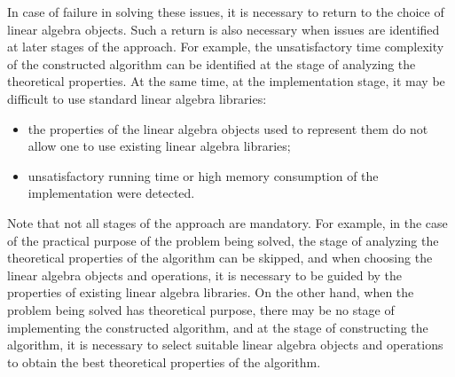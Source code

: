 In case of failure in solving these issues, it is necessary to return to the choice of linear algebra objects. Such a return is also necessary when issues are identified at later stages of the approach. For example, the unsatisfactory time complexity of the constructed algorithm can be identified at the stage of analyzing the theoretical properties. At the same time, at the implementation stage, it may be difficult to use standard linear algebra libraries:
\begin{itemize}
    \item the properties of the linear algebra objects used to represent them do not allow one to use existing linear algebra libraries;
    \item unsatisfactory running time or high memory consumption of the implementation were detected.
\end{itemize}

Note that not all stages of the approach are mandatory. For example, in the case of the practical purpose of the problem being solved, the stage of analyzing the theoretical properties of the algorithm can be skipped, and when choosing the linear algebra objects and operations, it is necessary to be guided by the properties of existing linear algebra libraries. On the other hand, when the problem being solved has theoretical purpose, there may be no stage of implementing the constructed algorithm, and at the stage of constructing the algorithm, it is necessary to select suitable linear algebra objects and operations to obtain the best theoretical properties of the algorithm.

